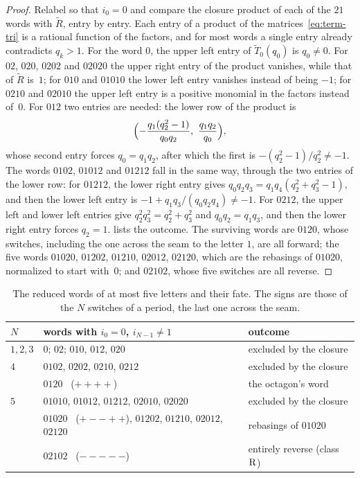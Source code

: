 \begin{proof}
Relabel so that $i_0=0$ and compare the closure product of each of the $21$ words with
$\widetilde R$, entry by entry. Each entry of a product of the matrices~\eqref{eq:term-tri} is
a rational function of the factors, and for most words a single entry already contradicts
$q_k>1$. For the word $0$, the upper left entry of $\widetilde T_0(q_0)$ is $q_0\neq0$. For
$02$, $020$, $0202$ and $02020$ the upper right entry of the product vanishes, while that of
$\widetilde R$ is~$1$; for $010$ and $01010$ the lower left entry vanishes instead of being
$-1$; for $0210$ and $02010$ the upper left entry is a positive monomial in the factors instead
of~$0$. For $012$ two entries are needed: the lower row of the product is
\[
 \Bigl(-\frac{q_1(q_2^2-1)}{q_0q_2},\ \frac{q_1q_2}{q_0}\Bigr),
\]
whose second entry forces $q_0=q_1q_2$, after which the first is $-(q_2^2-1)/q_2^2\ne-1$. The
words $0102$, $01012$ and $01212$ fall in the same way, through the two entries of the lower row:
for $01212$, the lower right entry gives $q_0q_2q_3=q_1q_4(q_2^2+q_3^2-1)$, and then the lower left
entry is $-1+q_1q_3/(q_0q_2q_4)\ne-1$. For $0212$, the upper left and lower left entries give
$q_2^2q_3^2=q_2^2+q_3^2$ and $q_0q_2=q_1q_3$, and then the lower right entry forces $q_2=1$.  lists the outcome. The surviving words are
$0120$, whose switches, including the one across the seam to the letter $1$, are all forward;
the five words $01020$, $01202$, $01210$, $02012$, $02120$, which are the rebasings of $01020$,
normalized to start with~$0$; and $02102$, whose five switches are all reverse.
\end{proof}

\begin{table}[htbp]
\centering
\begin{tabular}{@{}l>{\raggedright\arraybackslash}p{}l@{}}
\toprule
$N$ & words with $i_0=0$, $i_{N-1}\ne1$ & outcome\\
\midrule
$1,2,3$ & $0$; $02$; $010$, $012$, $020$ & excluded by the closure\\
$4$ & $0102$, $0202$, $0210$, $0212$ & excluded by the closure\\
    & $0120$ \ ($++++$) & the octagon's word\\
$5$ & $01010$, $01012$, $01212$, $02010$, $02020$ & excluded by the closure\\
    & $01020$ \ ($+--++$), $01202$, $01210$, $02012$, $02120$ & rebasings of $01020$\\
    & $02102$ \ ($-----$) & entirely reverse (class $\mathrm{R}$)\\
\bottomrule
\end{tabular}
\caption{The reduced words of at most five letters and their fate. The signs are those of the
$N$ switches of a period, the last one across the seam.}
\label{tab:terminal-words}
\end{table}

